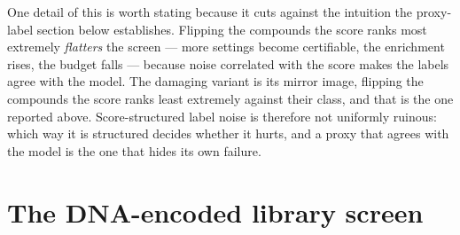 \documentclass[10pt]{article}
\begin{document}
One detail of this is worth stating because it cuts against the intuition the proxy-label section below establishes. Flipping the compounds the score ranks most extremely \emph{flatters} the screen --- more settings become certifiable, the enrichment rises, the budget falls --- because noise correlated with the score makes the labels agree with the model. The damaging variant is its mirror image, flipping the compounds the score ranks least extremely against their class, and that is the one reported above. Score-structured label noise is therefore not uniformly ruinous: which way it is structured decides whether it hurts, and a proxy that agrees with the model is the one that hides its own failure.



\section{The DNA-encoded library screen}
\label{sec:del}
\end{document}
